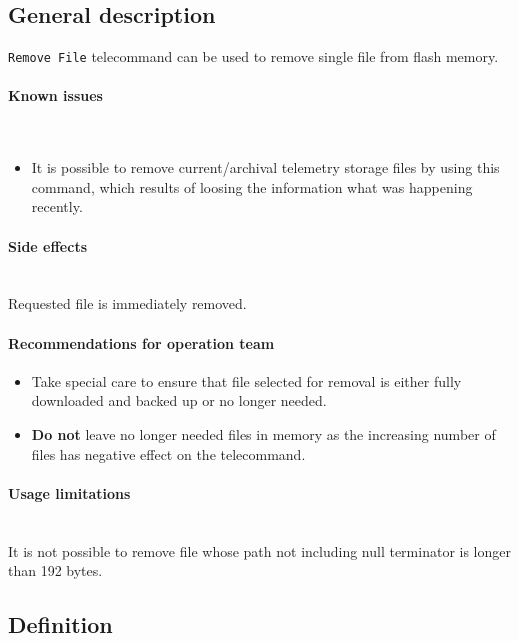 

\subsection{General description}
\texttt{Remove File} telecommand can be used to remove single file from \obc flash memory. 

\paragraph{Known issues} \mbox{} \\
\begin{itemize}
    \item It is possible to remove current/archival telemetry storage files by using this command, which
    results of loosing the information what was happening recently. 
\end{itemize}

\paragraph{Side effects} \mbox{} \\
Requested file is immediately removed.

\paragraph{Recommendations for operation team}
\begin{itemize}
    \item Take special care to ensure that file selected for removal is either fully downloaded and
    backed up or no longer needed.
    \item \textbf{Do not} leave no longer needed files in memory as the increasing number of files has negative effect 
    on the  telecommand.
\end{itemize}

\paragraph{Usage limitations}\mbox{}\\ 
It is not possible to remove file whose path not including null terminator is longer than 192 bytes.

\subsection{Definition}

